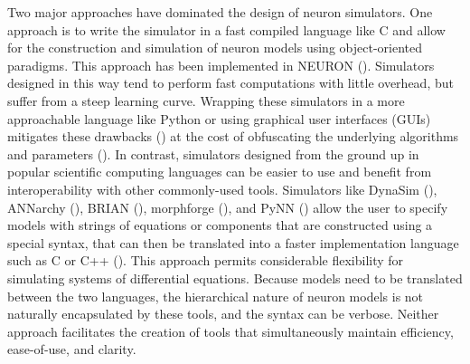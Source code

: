 \documentclass{frontiersSCNS} %
\begin{document}
Two major approaches have dominated the design of neuron simulators. One approach is to write the simulator in a fast compiled language like C and allow for the construction and simulation of neuron models using object-oriented paradigms. This approach has been implemented in NEURON (\cite{hinesNEURONSimulationEnvironment1997}). Simulators designed in this way tend to perform fast computations with little overhead, but suffer from a steep learning curve. Wrapping these simulators in a more approachable language like Python or using graphical user interfaces (GUIs) mitigates these drawbacks (\cite{hinesNEURONPython2009, gratiy2018bionet}) at the cost of obfuscating the underlying algorithms and parameters (\cite{bretteSimulationNetworksSpiking2007, hinesNEURONPython2009}). In contrast, simulators designed from the ground up in popular scientific computing languages can be easier to use and benefit from interoperability with other commonly-used tools. Simulators like DynaSim (\cite{sherfeyDynaSimMATLABToolbox2018}), ANNarchy (\cite{vitayANNarchyCodeGeneration2015}), BRIAN (\cite{stimbergBrianSecondComing2013}), morphforge (\cite{hullMorphforgeToolboxSimulating2014}), and PyNN (\cite{davisonPyNNCommonInterface2009}) allow the user to specify models with strings of equations or components that are constructed using a special syntax, that can then be translated into a faster implementation language such as C or C++ (\cite{stimbergEquationorientedSpecificationNeural2014}). This approach permits considerable flexibility for simulating systems of differential equations. Because models need to be translated between the two languages, the hierarchical nature of neuron models is not naturally encapsulated by these tools, and the syntax can be verbose. Neither approach facilitates the creation of tools that simultaneously maintain efficiency, ease-of-use, and clarity.
\end{document}
